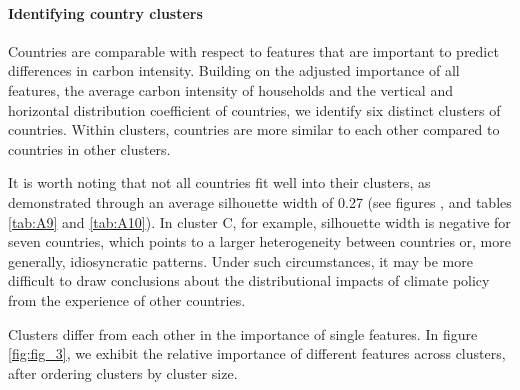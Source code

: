 \documentclass[12pt, a4paper]{article}
\begin{document}
\begin{figure}[ht!]
\end{figure}

\clearpage

\paragraph{Identifying country clusters}

Countries are comparable with respect to features that are important to predict differences in carbon intensity. Building on the adjusted importance of all features, the average carbon intensity of households and the vertical and horizontal distribution coefficient of countries, we identify six distinct clusters of countries. Within clusters, countries are more similar to each other compared to countries in other clusters. 

It is worth noting that not all countries fit well into their clusters, as demonstrated through an average silhouette width of 0.27 (see figures ,  and tables \ref{tab:A9} and \ref{tab:A10}). In cluster C, for example, silhouette width is negative for seven countries, which points to a larger heterogeneity between countries or, more generally, idiosyncratic patterns. Under such circumstances, it may be more difficult to draw conclusions about the distributional impacts of climate policy from the experience of other countries. 

Clusters differ from each other in the importance of single features. In figure \ref{fig:fig_3}, we exhibit the relative importance of different features across clusters, after ordering clusters by cluster size. 
\end{document}
